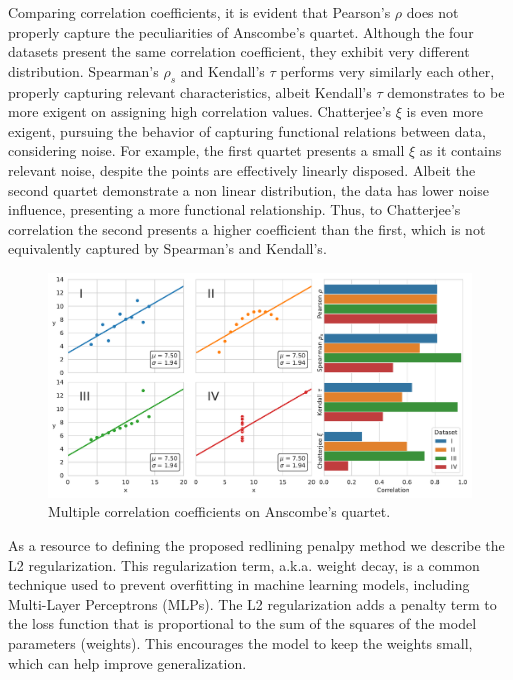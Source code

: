 Comparing correlation coefficients, it is evident that Pearson's $\rho$ does not properly capture the peculiarities of Anscombe's quartet. Although the four datasets present the same correlation coefficient, they exhibit very different distribution. Spearman's $\rho_s$ and Kendall's $\tau$ performs very similarly each other, properly capturing relevant characteristics, albeit Kendall's $\tau$ demonstrates to be more exigent on assigning high correlation values. Chatterjee's $\xi$ is even more exigent, pursuing the behavior of capturing functional relations between data, considering noise. For example, the first quartet presents a small $\xi$ as it contains relevant noise, despite the points are effectively linearly disposed. Albeit the second quartet demonstrate a non linear distribution, the data has lower noise influence, presenting a more functional relationship. Thus, to Chatterjee's correlation the second presents a higher coefficient than the first, which is not equivalently captured by Spearman's and Kendall's. 
\begin{figure}[!ht]
\centering
\caption{Multiple correlation coefficients on Anscombe's quartet.}\label{fig:anscombe}
    \includegraphics[width=1\linewidth]{images/anscombe_quartet.pdf}
\end{figure}



As a resource to defining the proposed redlining penalpy method we describe the L2 regularization. This regularization term, a.k.a. weight decay, is a common technique used to prevent overfitting in machine learning models, including Multi-Layer Perceptrons (MLPs). The L2 regularization adds a penalty term to the loss function that is proportional to the sum of the squares of the model parameters (weights). This encourages the model to keep the weights small, which can help improve generalization.

